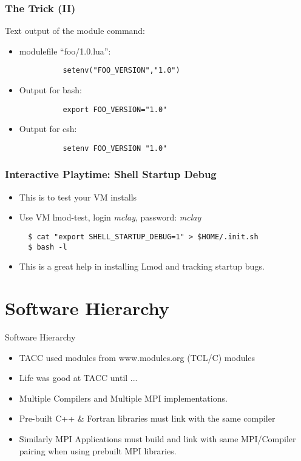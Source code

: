 \documentclass{beamer}
\begin{document}
\begin{frame}[fragile]
    \frametitle{The Trick (II)}
    Text output of the module command:
    \begin{itemize}
      \item modulefile ``foo/1.0.lua'':
    {
\begin{verbatim}
          setenv("FOO_VERSION","1.0")
\end{verbatim}
    }
     \item Output for bash:
\begin{verbatim}
          export FOO_VERSION="1.0"
\end{verbatim}
     \item Output for csh:
\begin{verbatim}
          setenv FOO_VERSION "1.0"
\end{verbatim}
    \end{itemize}
\end{frame}

\begin{frame}[fragile]
    \frametitle{Interactive Playtime: Shell Startup Debug}
  \begin{itemize}
    \item This is to test your VM installs
    \item Use VM lmod-test, login \emph{mclay}, password: \emph{mclay}
    {\small
\begin{verbatim}
  $ cat "export SHELL_STARTUP_DEBUG=1" > $HOME/.init.sh
  $ bash -l
\end{verbatim}
}
    \item This is a great help in installing Lmod and tracking startup bugs.
  \end{itemize}
\end{frame}




\section{Software Hierarchy}

\begin{frame}{Software Hierarchy}
  \begin{itemize}
    \item TACC used modules from www.modules.org (TCL/C) modules
    \item Life was good at TACC until ...
    \item Multiple Compilers and Multiple MPI implementations.
    \item Pre-built C++ \& Fortran libraries must link with the same compiler
    \item Similarly MPI Applications must build and link with same
      MPI/Compiler pairing when using prebuilt MPI libraries.
  \end{itemize}
\end{frame}
\end{document}
